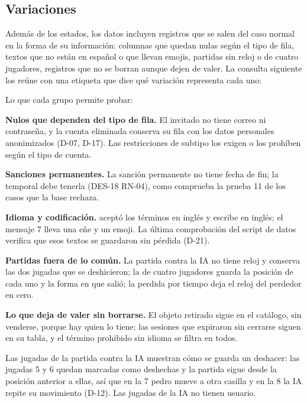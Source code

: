\subsection*{Variaciones}

Además de los estados, los datos incluyen registros que se salen del caso normal en la forma de su información: columnas que quedan nulas según el tipo de fila, textos que no están en español o que llevan emojis, partidas sin reloj o de cuatro jugadores, registros que no se borran aunque dejen de valer. La consulta siguiente los reúne con una etiqueta que dice qué variación representa cada uno:




Lo que cada grupo permite probar:

\begin{reglas}
  \item \textbf{Nulos que dependen del tipo de fila.} El invitado no tiene correo ni contraseña, y la cuenta eliminada conserva su fila con los datos personales anonimizados (\mbox{D-07}, \mbox{D-17}). Las restricciones  de subtipo los exigen o los prohíben según el tipo de cuenta.
  \item \textbf{Sanciones permanentes.} La sanción permanente no tiene fecha de fin; la temporal debe tenerla (\mbox{DES-18} \mbox{RN-04}), como comprueba la prueba 11 de los casos que la base rechaza.
  \item \textbf{Idioma y codificación.}  aceptó los términos en inglés y escribe en inglés; el mensaje 7 lleva una eñe y un emoji. La última comprobación del script de datos verifica que esos textos se guardaron sin pérdida (\mbox{D-21}).
  \item \textbf{Partidas fuera de lo común.} La partida contra la IA no tiene reloj y conserva las dos jugadas que se deshicieron; la de cuatro jugadores guarda la posición de cada uno y la forma en que salió; la perdida por tiempo deja el reloj del perdedor en cero.
  \item \textbf{Lo que deja de valer sin borrarse.} El objeto retirado sigue en el catálogo, sin venderse, porque hay quien lo tiene; las sesiones que expiraron sin cerrarse siguen en su tabla, y el término prohibido sin idioma se filtra en todos.
\end{reglas}

Las jugadas de la partida contra la IA muestran cómo se guarda un deshacer: las jugadas 5 y 6 quedan marcadas como deshechas y la partida sigue desde la posición anterior a ellas, así que en la 7 pedro mueve a otra casilla y en la 8 la IA repite su movimiento (\mbox{D-12}). Las jugadas de la IA no tienen usuario.


